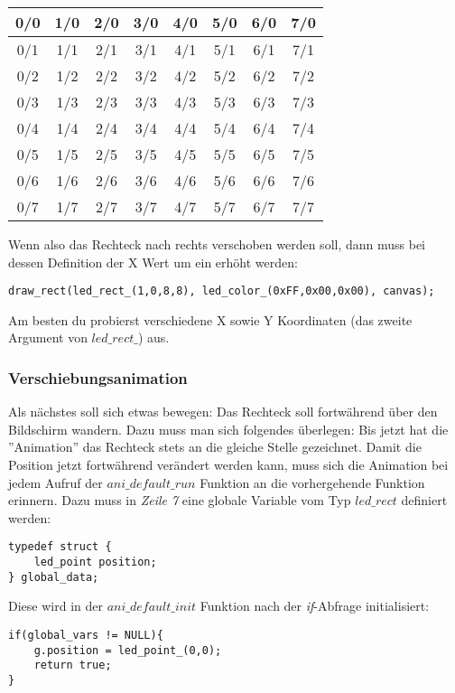 \documentclass[10pt,a4paper]{article}
\begin{document}
\begin{tabular}{|c|c|c|c|c|c|c|c|}
\hline 
0/0 & 1/0 & 2/0 & 3/0 & 4/0 & 5/0 & 6/0 & 7/0 \\ 
\hline 
0/1 & 1/1 & 2/1 & 3/1 & 4/1 & 5/1 & 6/1 & 7/1 \\
\hline 
0/2 & 1/2 & 2/2 & 3/2 & 4/2 & 5/2 & 6/2 & 7/2 \\  
\hline 
0/3 & 1/3 & 2/3 & 3/3 & 4/3 & 5/3 & 6/3 & 7/3 \\ 
\hline 
0/4 & 1/4 & 2/4 & 3/4 & 4/4 & 5/4 & 6/4 & 7/4 \\ 
\hline 
0/5 & 1/5 & 2/5 & 3/5 & 4/5 & 5/5 & 6/5 & 7/5 \\  
\hline 
0/6 & 1/6 & 2/6 & 3/6 & 4/6 & 5/6 & 6/6 & 7/6 \\ 
\hline 
0/7 & 1/7 & 2/7 & 3/7 & 4/7 & 5/7 & 6/7 & 7/7 \\  
\hline 
\end{tabular}

Wenn also das Rechteck nach rechts verschoben werden soll, dann muss bei dessen Definition der X Wert um ein erhöht werden:
\begin{lstlisting}
draw_rect(led_rect_(1,0,8,8), led_color_(0xFF,0x00,0x00), canvas);
\end{lstlisting}
Am besten du probierst verschiedene X sowie Y Koordinaten (das zweite Argument von \textit{$led\_rect\_$}) aus.

\subsubsection{Verschiebungsanimation}
Als nächstes soll sich etwas bewegen: Das Rechteck soll fortwährend über den Bildschirm wandern.
Dazu muss man sich folgendes überlegen: Bis jetzt hat die ''Animation'' das Rechteck stets an die gleiche Stelle gezeichnet. Damit die Position jetzt fortwährend verändert werden kann, muss sich die Animation bei jedem Aufruf der \textit{$ani\_default\_run$} Funktion an die vorhergehende Funktion erinnern. Dazu muss in \textit{Zeile 7} eine globale Variable vom Typ \textit{$led\_rect$} definiert werden:
\begin{lstlisting}
typedef struct {
    led_point position;
} global_data;
\end{lstlisting}

Diese wird in der \textit{$ani\_default\_init$} Funktion nach der \textit{if}-Abfrage initialisiert:
\begin{lstlisting}
if(global_vars != NULL){
    g.position = led_point_(0,0);
    return true;
}
\end{lstlisting}
\end{document}

